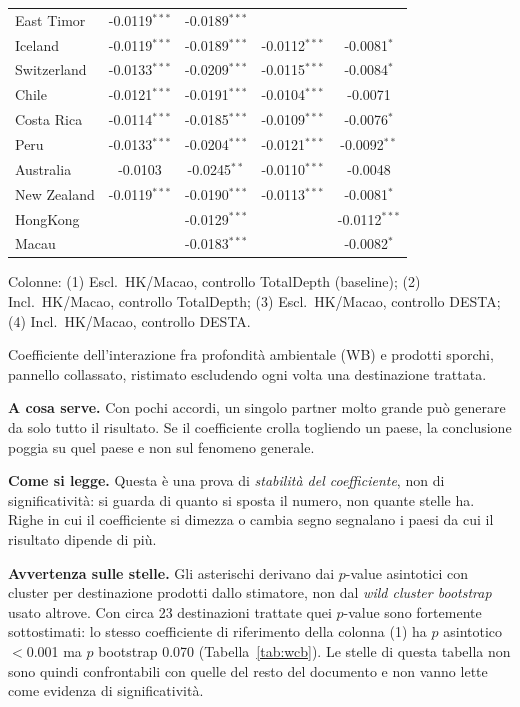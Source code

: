 \begin{table}[htbp]
\begin{threeparttable}
\begin{tabular}{lcccc}
East Timor & -0.0119$^{***}$ & -0.0189$^{***}$ &  &  \\
Iceland & -0.0119$^{***}$ & -0.0189$^{***}$ & -0.0112$^{***}$ & -0.0081$^{*}$ \\
Switzerland & -0.0133$^{***}$ & -0.0209$^{***}$ & -0.0115$^{***}$ & -0.0084$^{*}$ \\
Chile & -0.0121$^{***}$ & -0.0191$^{***}$ & -0.0104$^{***}$ & -0.0071 \\
Costa Rica & -0.0114$^{***}$ & -0.0185$^{***}$ & -0.0109$^{***}$ & -0.0076$^{*}$ \\
Peru & -0.0133$^{***}$ & -0.0204$^{***}$ & -0.0121$^{***}$ & -0.0092$^{**}$ \\
Australia & -0.0103 & -0.0245$^{**}$ & -0.0110$^{***}$ & -0.0048 \\
New Zealand & -0.0119$^{***}$ & -0.0190$^{***}$ & -0.0113$^{***}$ & -0.0081$^{*}$ \\
HongKong &  & -0.0129$^{***}$ &  & -0.0112$^{***}$ \\
Macau &  & -0.0183$^{***}$ &  & -0.0082$^{*}$ \\
\bottomrule
\end{tabular}
\begin{tablenotes}[flushleft]\footnotesize
\item Colonne: (1) Escl.\ HK/Macao, controllo TotalDepth (baseline); (2) Incl.\ HK/Macao, controllo TotalDepth; (3) Escl.\ HK/Macao, controllo DESTA; (4) Incl.\ HK/Macao, controllo DESTA.
\item Coefficiente dell'interazione fra profondit\`a ambientale (WB) e prodotti sporchi, pannello collassato, ristimato escludendo ogni volta una destinazione trattata.
\item \textbf{A cosa serve.} Con pochi accordi, un singolo partner molto grande pu\`o generare da solo tutto il risultato. Se il coefficiente crolla togliendo un paese, la conclusione poggia su quel paese e non sul fenomeno generale.
\item \textbf{Come si legge.} Questa \`e una prova di \emph{stabilit\`a del coefficiente}, non di significativit\`a: si guarda di quanto si sposta il numero, non quante stelle ha. Righe in cui il coefficiente si dimezza o cambia segno segnalano i paesi da cui il risultato dipende di pi\`u.
\item \textbf{Avvertenza sulle stelle.} Gli asterischi derivano dai $p$-value asintotici con cluster per destinazione prodotti dallo stimatore, non dal \emph{wild cluster bootstrap} usato altrove. Con circa 23 destinazioni trattate quei $p$-value sono fortemente sottostimati: lo stesso coefficiente di riferimento della colonna (1) ha $p$ asintotico $<$0.001 ma $p$ bootstrap 0.070 (Tabella~\ref{tab:wcb}). Le stelle di questa tabella non sono quindi confrontabili con quelle del resto del documento e non vanno lette come evidenza di significativit\`a.

\end{tablenotes}
\end{threeparttable}
\end{table}
